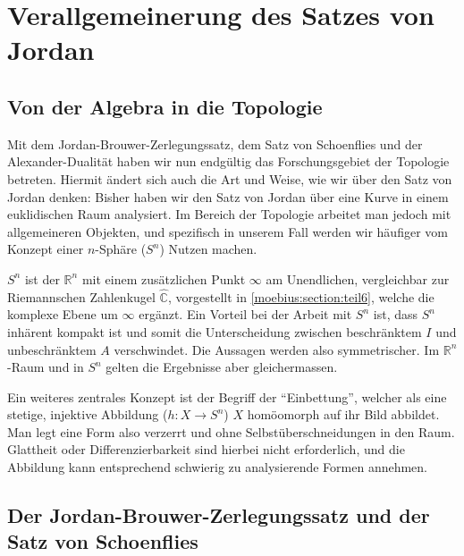 %
%
%
%
\section{Verallgemeinerung des Satzes von Jordan
\label{jordan:section:verallgemeinerung}}

\subsection{Von der Algebra in die Topologie
\label{jordan:subsection:algebra_topologie}}

Mit dem Jordan-Brouwer-Zerlegungssatz, dem Satz von Schoenflies und der Alexander-Dualität haben wir nun endgültig das Forschungsgebiet der Topologie betreten.
%
Hiermit ändert sich auch die Art und Weise, wie wir über den Satz von Jordan denken:
Bisher haben wir den Satz von Jordan über eine Kurve in einem euklidischen Raum analysiert.
Im Bereich der Topologie arbeitet man jedoch mit allgemeineren Objekten, und spezifisch in unserem Fall werden wir häufiger vom Konzept einer $n$-Sphäre ($S^n$) Nutzen machen.

$S^n$ ist der $\mathbb{R}^n$ mit einem zusätzlichen Punkt $\infty$ am Unendlichen, vergleichbar zur Riemannschen Zahlenkugel $\hat{\mathbb{C}}$, vorgestellt in \ref{moebius:section:teil6}, welche die komplexe Ebene um $\infty$ ergänzt.
Ein Vorteil bei der Arbeit mit $S^n$ ist, dass $S^n$ inhärent kompakt ist und somit die Unterscheidung zwischen beschränktem $I$ und unbeschränktem $A$ verschwindet.
Die Aussagen werden also symmetrischer.
Im $\mathbb{R}^n$-Raum und in $S^n$ gelten die Ergebnisse aber gleichermassen.

Ein weiteres zentrales Konzept ist der Begriff der ``Einbettung'', welcher als eine stetige, injektive Abbildung ($h : X \to S^n$) $X$ homöomorph auf ihr Bild abbildet.
Man legt eine Form also verzerrt und ohne Selbstüberschneidungen in den Raum.
Glattheit oder Differenzierbarkeit sind hierbei nicht erforderlich, und die Abbildung kann entsprechend schwierig zu analysierende Formen annehmen.

\subsection{Der Jordan-Brouwer-Zerlegungssatz und der Satz von Schoenflies
\label{jordan:subsection:jordanbrouwer}}

